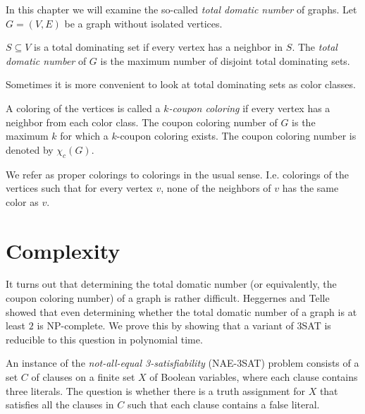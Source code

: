 In this chapter we will examine the so-called \emph{total domatic number} of graphs.
Let $G = (V, E)$ be a graph without isolated vertices.

\begin{definition}
  $S \subseteq V$ is a total dominating set if every vertex has a neighbor in
  $S$. The \emph{total domatic number} of $G$ is the maximum number of disjoint total
  dominating sets.
\end{definition}

Sometimes it is more convenient to look at total dominating sets as color classes.

\begin{definition}
  A coloring of the vertices is called a \emph{$k$-coupon coloring} if every vertex
  has a neighbor from each color class. The coupon coloring number of $G$ is
  the maximum $k$ for which a $k$-coupon coloring exists. The coupon coloring
  number is denoted by $\chi_c(G)$.
\end{definition}

\begin{remark}
  We refer as proper colorings to colorings in the usual sense. I.e. colorings of
  the vertices such that for every vertex $v$, none of the neighbors of $v$ has the
  same color as $v$.
\end{remark}

\section{Complexity}

It turns out that determining the total domatic number (or equivalently, the
coupon coloring number) of a graph is rather difficult. Heggernes and Telle \cite{np-complete}
showed that even determining whether the total
domatic number of a graph is at least $2$ is NP-complete. We prove this by showing
that a variant of 3SAT is reducible to this question in polynomial time.

\begin{definition}
  An instance of the \emph{not-all-equal 3-satisfiability} (NAE-3SAT) problem consists of
  a set $C$ of clauses on a finite set $X$ of Boolean variables, where each clause
  contains three literals. The question is whether there is a truth assignment for
  $X$ that satisfies all the clauses in $C$ such that each clause contains a false
  literal.
\end{definition}

